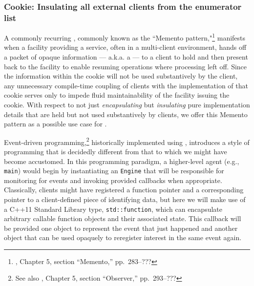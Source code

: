 \subsubsection[Cookie: Insulating all external clients from the enumerator list]{Cookie: Insulating all external clients from the enumerator list}\label{cookie:-insulating-all-external-clients-from-the-enumerator-list}

A commonly recurring , commonly known as the
``Memento pattern,"\footnote{\cite{gamma95}, Chapter 5, section ``Memento,'' pp.~283--???} manifests when a facility providing a service, often in a
multi-client environment, hands off a packet of opaque information ---
a.k.a. a  --- to a client to hold and then present back to
the facility to enable resuming operations where processing left off.
Since the information within the cookie will not be used substantively
by the client, any unnecessary compile-time coupling of clients with the
implementation of that cookie serves only to impede fluid
maintainability of the facility issuing the cookie. With respect
to not just \emph{encapsulating} but \emph{insulating} pure
implementation details that are held but not used substantively by
clients, we offer this Memento pattern as a possible use case
for .

Event-driven programming,\footnote{See also \cite{gamma95}, Chapter 5, section ``Observer,''  pp.~293--???} historically implemented using , introduces a style of programming that is decidedly
different from that to which we might have become accustomed. In this
programming paradigm, a higher-level agent (e.g., \lstinline!main!) would
begin by instantiating an \lstinline!Engine! that will be responsible for
monitoring for events and invoking provided callbacks when appropriate.
Classically, clients might have registered a function pointer and a
corresponding pointer to a client-defined piece of identifying data, but
here we will make use of a C++11 Standard Library type,
\lstinline!std::function!, which can encapsulate arbitrary callable
function objects and their associated state. This callback will be
provided one object to represent the event that just happened and
another object that can be used opaquely to reregister interest in the
same event again.

